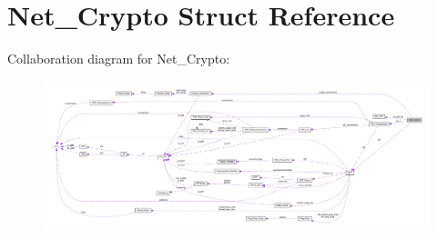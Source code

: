 \hypertarget{struct_net___crypto}{\section{Net\+\_\+\+Crypto Struct Reference}
\label{struct_net___crypto}
}


Collaboration diagram for Net\+\_\+\+Crypto\+:
\nopagebreak
\begin{figure}[H]
\begin{center}
\leavevmode
\includegraphics[width=350pt]{struct_net___crypto__coll__graph}
\end{center}
\end{figure}
